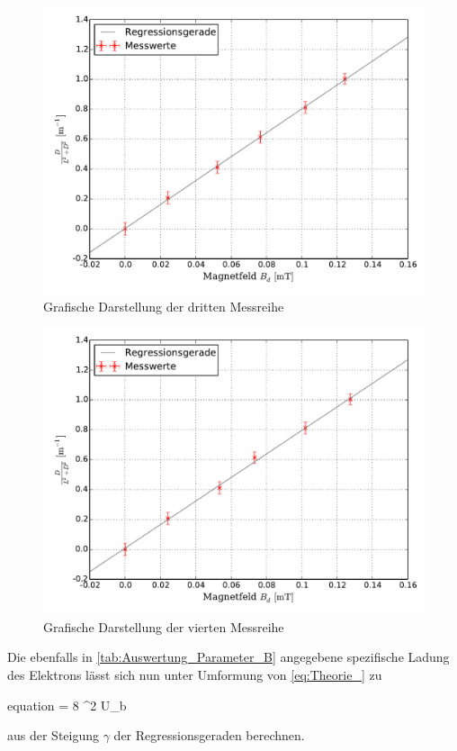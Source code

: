 		\begin{figure}[!h]
				\includegraphics[scale=0.7]{Grafiken/BFeld_Messreihe_III.pdf}
				\caption{Grafische Darstellung der dritten Messreihe}\label{fig:Auswertung_Messdaten_II_III}
		\end{figure}
		\begin{figure}[!h]
				\includegraphics[scale=0.7]{Grafiken/BFeld_Messreihe_IV.pdf}
				\caption{Grafische Darstellung der vierten Messreihe}\label{fig:Auswertung_Messdaten_II_IV}
		\end{figure}
		
		
		Die ebenfalls in \cref{tab:Auswertung_Parameter_B} angegebene spezifische Ladung des Elektrons lässt sich nun unter Umformung von \cref{eq:Theorie_} zu 
		\begin{empheq}{equation} 
			 = 8 \cdot \gamma^{2} \cdot U_{b}  
		\end{empheq}	
		aus der Steigung $\gamma$ der Regressionsgeraden berechnen.
		
